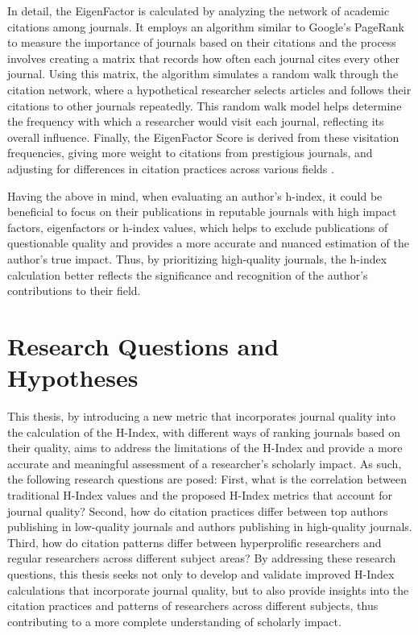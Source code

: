 In detail, the EigenFactor is calculated by analyzing the network of academic
citations among journals. It employs an algorithm similar to Google's PageRank
to measure the importance of journals based on their citations and the process
involves creating a matrix that records how often each journal cites every
other journal. Using this matrix, the algorithm simulates a random walk through
the citation network, where a hypothetical researcher selects articles and
follows their citations to other journals repeatedly. This random walk model
helps determine the frequency with which a researcher would visit each journal,
reflecting its overall influence. Finally, the EigenFactor Score is derived
from these visitation frequencies, giving more weight to citations from
prestigious journals, and adjusting for differences in citation practices
across various fields \cite{Bergstrom11433, Alan2009}.

Having the above in mind, when evaluating an author's h-index, it could be
beneficial to focus on their publications in reputable journals with high
impact factors, eigenfactors or h-index values, which helps to exclude
publications of questionable quality and provides a more accurate and nuanced
estimation of the author's true impact. Thus, by prioritizing high-quality
journals, the h-index calculation better reflects the significance and
recognition of the author's contributions to their field.

\section{Research Questions and Hypotheses}
This thesis, by introducing a new metric that incorporates journal quality into
the calculation of the H-Index, with different ways of ranking journals based
on their quality, aims to address the limitations of the H-Index
and provide a more accurate and meaningful assessment of a researcher's
scholarly impact. As such, the following research questions are posed: First,
what is the correlation between traditional H-Index values and the proposed
H-Index metrics that account for journal quality? Second, how do citation
practices differ between top authors publishing in low-quality journals and
authors publishing in high-quality journals. Third, how do citation patterns
differ between hyperprolific researchers and regular researchers across
different subject areas? By addressing these research questions, this thesis
seeks not only to develop and validate improved H-Index calculations that
incorporate journal quality, but to also provide insights into the citation
practices and patterns of researchers across different subjects, thus
contributing to a more complete understanding of scholarly impact.

